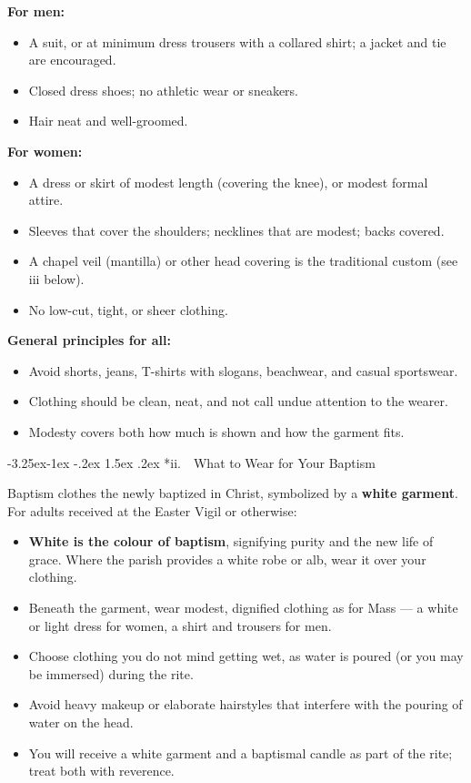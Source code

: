 \documentclass[11pt]{article}
\makeatletter
\renewcommand\subsection{\@startsection{subsection}{2}{\z@}%
  {-3.25ex\@plus -1ex \@minus -.2ex}%
  {1.5ex \@plus .2ex}%
  {\normalfont\large\bfseries\color{churchgold}}}
\makeatother
\begin{document}
\textbf{For men:}
\begin{itemize}
  \item A suit, or at minimum dress trousers with a collared shirt; a jacket and tie are encouraged.
  \item Closed dress shoes; no athletic wear or sneakers.
  \item Hair neat and well-groomed.
\end{itemize}

\textbf{For women:}
\begin{itemize}
  \item A dress or skirt of modest length (covering the knee), or modest formal attire.
  \item Sleeves that cover the shoulders; necklines that are modest; backs covered.
  \item A chapel veil (mantilla) or other head covering is the traditional custom (see iii below).
  \item No low-cut, tight, or sheer clothing.
\end{itemize}

\textbf{General principles for all:}
\begin{itemize}
  \item Avoid shorts, jeans, T-shirts with slogans, beachwear, and casual sportswear.
  \item Clothing should be clean, neat, and not call undue attention to the wearer.
  \item Modesty covers both how much is shown and how the garment fits.
\end{itemize}

\subsection*{ii.~~What to Wear for Your Baptism}

Baptism clothes the newly baptized in Christ, symbolized by a
\textbf{white garment}. For adults received at the Easter Vigil or
otherwise:

\begin{itemize}
  \item \textbf{White is the colour of baptism}, signifying purity and the new life of grace. Where the parish provides a white robe or alb, wear it over your clothing.
  \item Beneath the garment, wear modest, dignified clothing as for Mass --- a white or light dress for women, a shirt and trousers for men.
  \item Choose clothing you do not mind getting wet, as water is poured (or you may be immersed) during the rite.
  \item Avoid heavy makeup or elaborate hairstyles that interfere with the pouring of water on the head.
  \item You will receive a white garment and a baptismal candle as part of the rite; treat both with reverence.
\end{itemize}
\end{document}
